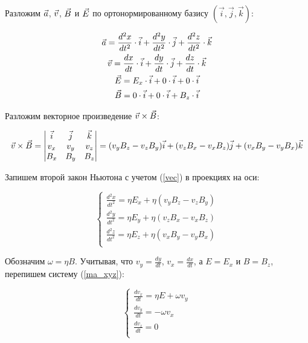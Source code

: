 Разложим $\vec{a}$, $\vec{v}$, $\vec{B}$ и $\vec{E}$ по ортонормированному базису $(\vec{i},\vec{j},\vec{k})$:

\begin{gather}
	\vec{a}=\frac{d^2x}{dt^2}\cdot\vec{i}+\frac{d^2y}{dt^2}\cdot\vec{j}+\frac{d^2z}{dt^2}\cdot\vec{k}\\
	\vec{v}=\frac{dx}{dt}\cdot\vec{i}+\frac{dy}{dt}\cdot\vec{j}+\frac{dz}{dt}\cdot\vec{k}\\
	\vec{E}=E_x\cdot\vec{i}+0\cdot\vec{i}+0\cdot\vec{i}\\
	\vec{B}=0\cdot\vec{i}+0\cdot\vec{i}+B_z\cdot\vec{i}
\end{gather}

Разложим векторное произведение $\vec{v}\times\vec{B}$:

\begin{gather}
	\label{vec}
	\vec{v}\times\vec{B} = \begin{vmatrix} \vec{i} & \vec{j} & \vec{k} \\ v_x & v_y & v_z \\ B_x & B_y & B_z \end{vmatrix}=(v_yB_z-v_zB_y)\vec{i}+(v_zB_x-v_xB_z)\vec{j}+(v_xB_y-v_yB_x)\vec{k}
\end{gather}

Запишем второй закон Ньютона с учетом (\ref{vec}) в проекциях на оси:

\begin{equation}
\label{ma_xyz}
 \begin{cases}
   \frac{d^2x}{dt^2}=\eta{}E_x+\eta(v_yB_z-v_zB_y)\\
   \frac{d^2y}{dt^2}=\eta{}E_y+\eta(v_zB_x-v_xB_z)\\
   \frac{d^2z}{dt^2}=\eta{}E_z+\eta(v_xB_y-v_yB_x)\\
 \end{cases}
\end{equation}

Обозначим $\omega=\eta{B}$. Учитывая, что $v_y=\frac{dy}{dt}$, $v_x=\frac{dx}{dt}$,  а $E=E_x$ и $B=B_z$, перепишем систему (\ref{ma_xyz}):

\begin{equation}
\label{dv}
 \begin{cases}
   \frac{dv_x}{dt}=\eta{}E+\omega{}v_y\\
   \frac{dv_y}{dt}=-\omega{}v_x\\
   \frac{dv_z}{dt}=0\\
 \end{cases}
\end{equation}


